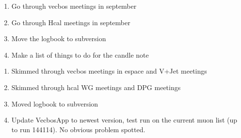

\begin{enumerate}
\item Go through vecbos meetings in september
\item Go through Hcal meetings in september
\item Move the logbook to subversion
\item Make a list of things to do for the candle note
\end{enumerate}


\begin{enumerate}
\item Skimmed through vecbos meetings in espace and V+Jet meetings
\item Skimmed through hcal WG meetings and DPG meetings
\item Moved logbook to subversion
\item Update VecbosApp to newest version, test run on the current muon list (up to run 144114).  No obvious problem spotted.
\end{enumerate}



